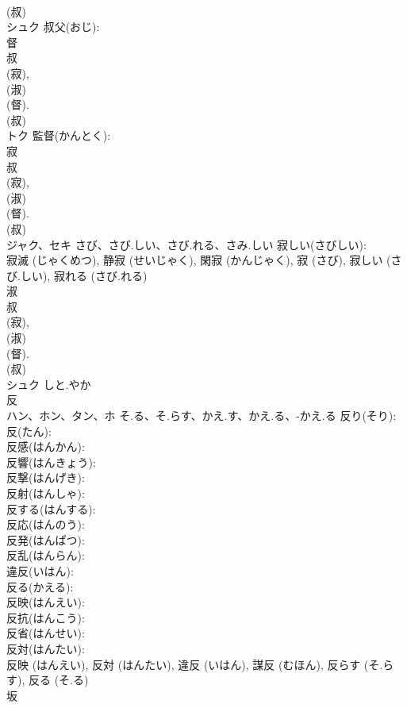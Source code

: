 \documentclass[8pt]{extreport}
\begin{document}
\begin{CJK}{UTF8}{min}
\\	(叔) 
\\	シュク		叔父(おじ): 
\\	督			
\\	叔 
\\	(寂), 
\\	(淑) 
\\	(督). 
\\	(叔) 
\\	トク		監督(かんとく): 
\\	寂			
\\	叔 
\\	(寂), 
\\	(淑) 
\\	(督). 
\\	(叔) 
\\	ジャク、セキ	さび、さび.しい、さび.れる、さみ.しい	寂しい(さびしい): 
\\	寂滅 (じゃくめつ), 静寂 (せいじゃく), 閑寂 (かんじゃく), 寂 (さび), 寂しい (さび.しい), 寂れる (さび.れる)
\\	淑			
\\	叔 
\\	(寂), 
\\	(淑) 
\\	(督). 
\\	(叔) 
\\	シュク	しと.やか		
\\	反			
\\	ハン、ホン、タン、ホ	そ.る、そ.らす、かえ.す、かえ.る、-かえ.る	反り(そり): 
\\	反(たん): 
\\	反感(はんかん): 
\\	反響(はんきょう): 
\\	反撃(はんげき): 
\\	反射(はんしゃ): 
\\	反する(はんする): 
\\	反応(はんのう): 
\\	反発(はんぱつ): 
\\	反乱(はんらん): 
\\	違反(いはん): 
\\	反る(かえる): 
\\	反映(はんえい): 
\\	反抗(はんこう): 
\\	反省(はんせい): 
\\	反対(はんたい): 
\\	反映 (はんえい), 反対 (はんたい), 違反 (いはん), 謀反 (むほん), 反らす (そ.らす), 反る (そ.る)
\\	坂			

\end{CJK}
\end{document}
